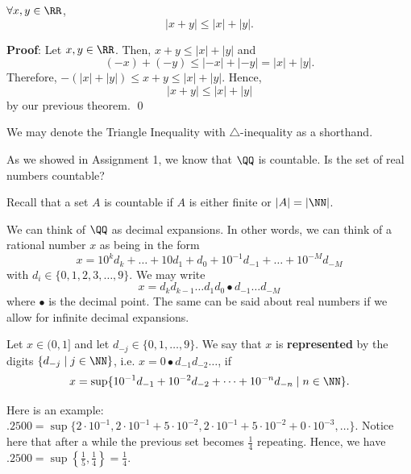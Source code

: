 

\begin{theorem}
$\forall x,y\in \RR$, 
\[
|x+y| \leq |x|+|y|.
\]
\end{theorem}
\textbf{Proof}: Let $x,y\in\RR$. Then, $x+y\leq |x|+|y|$ and
\[
(-x)+(-y) \leq |-x|+|-y| = |x|+|y|.
\]
Therefore, $-(|x|+|y|)\leq x+y \leq |x|+|y|$. Hence,
\[
|x+y|\leq |x|+|y|
\]
by our previous theorem. \qed 

\begin{remark}
We may denote the Triangle Inequality with $\triangle$-inequality as a shorthand.
\end{remark}

\begin{question}
As we showed in Assignment 1, we know that $\QQ$ is countable. Is the set of real numbers countable?
\end{question}

\begin{recall}
Recall that a set $A$ is countable if $A$ is either finite or $|A| = |\NN|$.
\end{recall}
We can think of $\QQ$ as decimal expansions. In other words, we can think of a rational number $x$ as being in the form
\[
x = 10^k d_k + \dots + 10 d_1 + d_0 + 10^{-1}d_{-1} + \dots + 10^{-M} d_{-M}
\]
with $d_i \in \{0,1,2,3,\dots, 9\}$. We may write
\[
x = d_kd_{k-1}\dots d_1 d_0 \bullet d_{-1} \dots d_{-M}
\]
where $\bullet$ is the decimal point. The same can be said about real numbers if we allow for infinite decimal expansions. 

\begin{definition}
Let $x\in (0,1]$ and let $d_{-j}\in\{0,1,\dots, 9\}$. We say that $x$ is \textbf{represented} by the digits $\{d_{-j}\mid j\in \NN\}$, i.e. $x= 0\bullet d_{-1} d_{-2}\dots$, if 
\[
x = \sup\{10^{-1}d_{-1}+10^{-2}d_{-2}+ \dots + 10^{-n}d_{-n} \mid n\in \NN\}.
\]
\end{definition}
Here is an example: $.2500 = \sup \{2\cdot 10^{-1}, 2\cdot 10^{-1}+5\cdot 10^{-2}, 2\cdot 10^{-1}+5\cdot 10^{-2} + 0 \cdot 10^{-3}, \dots\}$. Notice here that after a while the previous set becomes $\frac{1}{4}$ repeating. Hence, we have $.2500 = \sup\left\{ \frac{1}{5}, \frac{1}{4}\right\} = \frac{1}{4}$.

